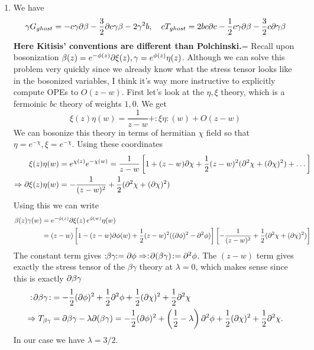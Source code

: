 \documentclass[11pt, class=article, crop=false]{standalone}
\begin{document}
\begin{enumerate}
	\item We have
	\[
		\gamma G_{ghost} = -c \gamma \partial \beta - \frac32 \partial c \gamma \beta - 2 \gamma^2 b, \quad c T_{ghost} = 2 b c \partial c - \frac12 c \gamma \partial \beta - \frac32 c \partial \gamma \beta
	\]
	\textbf{Here Kitisis' conventions are different than Polchinski.}= Recall upon bosonization $\beta(z) = e^{-\phi(z)} \partial \xi(z), \gamma = e^{\phi(z)} \eta(z)$. 
	Although we can solve this problem very quickly since we already know what the stress tensor looks like in the bosonized variables, I think it's way more instructive to explicitly compute OPEs to $O(z-w)$. First let's look at the $\eta, \xi$ theory, which is a fermoinic $bc$ theory of weights $1, 0$. We get
	\[
		\xi(z) \eta(w) = \frac{1}{z-w} + :\xi \eta:(w) + O(z-w)
	\]
	We can bosonize this theory in terms of hermitian $\chi$ field so that $\eta = e^{-\chi}, \xi = e^{-\chi}$. Using these coordinates
	\[
	\begin{aligned}
		\xi(z) \eta(w) &= e^{\chi(z)} e^{-\chi(w)} = \frac{1}{z-w} \left[1 + (z-w) \partial \chi + \frac12 (z-w)^2 (\partial^2 \chi + (\partial \chi)^2)  + \dots \right]\\
		\Rightarrow \partial \xi(z) \eta(w) &= -\frac{1}{(z-w)^2} + \frac12 (\partial^2 \chi + (\partial \chi)^2)
	\end{aligned}
	\]
	Using this we can write
	\[
	\begin{aligned}
		\beta(z) \gamma(w) &= e^{-\phi(z)} \partial \xi(z) \, e^{\phi(w)} \eta(w) \\
		&= (z-w) \left[1 - (z-w) \partial \phi(w) + \frac12 (z-w)^2 ((\partial\phi)^2 - \partial^2 \phi) \right] \left[-\frac{1}{(z-w)^2} + \frac12 (\partial^2 \chi + (\partial \chi)^2) \right]
	\end{aligned}
	\]
	The constant term gives $:\!\!\beta \gamma\!\!: = \partial \phi \Rightarrow :\!\partial(\beta \gamma)\!: = \partial^2 \phi$. The $(z-w)$ term gives exactly the stress tensor of the $\beta \gamma$ theory at $\lambda = 0$, which makes sense since this is exactly $\partial \beta \gamma$
	\[
	\begin{aligned}
		:\!\partial \beta \gamma\!: &= -\frac12 (\partial \phi)^2 + \frac12 \partial^2 \phi + \frac12 (\partial\chi)^2 + \frac12 \partial^2 \chi\\
		\Rightarrow 	T_{\beta \gamma } &= \partial \beta \gamma - \lambda \partial(\beta \gamma) = -\frac12 (\partial \phi)^2 + \left(\frac12 - \lambda\right) \partial^2 \phi + \frac12 (\partial\chi)^2 + \frac12 \partial^2 \chi.
	\end{aligned}
	\]
	In our case we have $\lambda = 3/2$. %
	\[
	\begin{aligned}

\end{aligned}\]
\end{enumerate}
\end{document}
